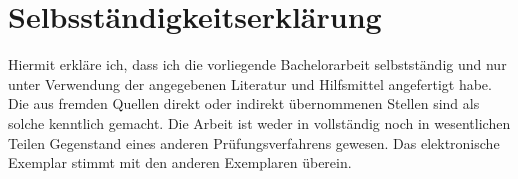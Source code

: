\documentclass[%
  bachelor,%
  draft,%
  english,%
  ngerman,%
  male,%
]{iswstud}
\theoremstyle{plain}
\theoremstyle{definition}
\theoremstyle{definition}
\theoremstyle{remark}
\begin{document}

\printbibliography

\chapter*{Selbsständigkeitserklärung}
Hiermit erkläre ich, dass ich die vorliegende Bachelorarbeit selbstständig und nur unter Verwendung der angegebenen Literatur und Hilfsmittel angefertigt habe. Die aus
fremden Quellen direkt oder indirekt übernommenen Stellen sind als solche kenntlich
gemacht.
Die Arbeit ist weder in vollständig noch in wesentlichen Teilen Gegenstand
eines anderen Prüfungsverfahrens gewesen.
Das elektronische Exemplar stimmt mit den anderen Exemplaren überein.
\end{document}
